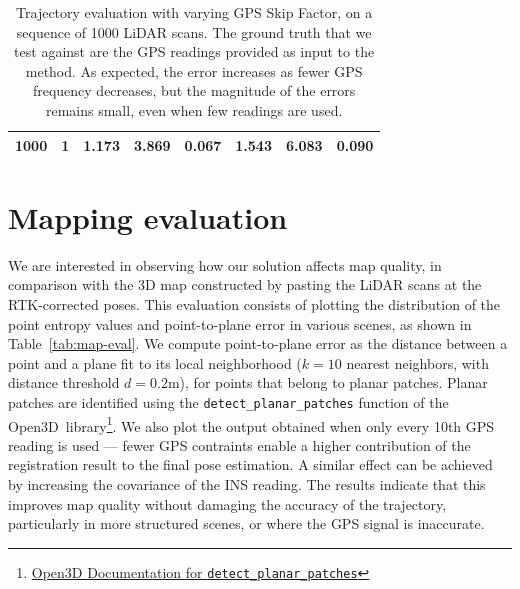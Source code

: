 \begin{table}[h]
{\begin{tabular}{cc|ccc|ccc}
            1000            & 1              & 1.173                             & 3.869                              & 0.067             & 1.543          & 6.083                & 0.090             \\
            \hline
        \end{tabular}
    }
    \caption{Trajectory evaluation with varying GPS Skip Factor, on a sequence of 1000 LiDAR scans. The ground truth that we test against are the GPS readings provided as input to the method. As expected, the error increases as fewer GPS frequency decreases, but the magnitude of the errors remains small, even when few readings are used.}
    \label{tab:gps-skip}
\end{table}

\section{Mapping evaluation}

We are interested in observing how our solution affects map quality, in comparison with the 3D map constructed by pasting the LiDAR scans at the RTK-corrected poses. This evaluation consists of plotting the distribution of the point entropy values and point-to-plane error in various scenes, as shown in Table~\ref{tab:map-eval}. We compute point-to-plane error as the distance between a point and a plane fit to its local neighborhood ($k=10$ nearest neighbors, with distance threshold $d=0.2$m), for points that belong to planar patches. Planar patches are identified using the \texttt{detect\_planar\_patches} function of the Open3D~library\footnote{\href{https://www.open3d.org/docs/latest/python_api/open3d.geometry.PointCloud.html\#open3d.geometry.PointCloud.detect_planar_patches}{Open3D Documentation for \texttt{detect\_planar\_patches}}}.
We also plot the output obtained when only every 10th GPS reading is used --- fewer GPS contraints enable a higher contribution of the registration result to the final pose estimation. A similar effect can be achieved by increasing the covariance of the INS reading. The results indicate that this improves map quality without damaging the accuracy of the trajectory, particularly in more structured scenes, or where the GPS signal is inaccurate.

